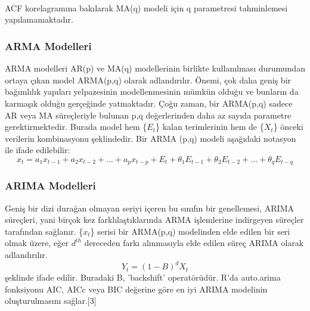 \documentclass[11pt]{article}
\begin{document}
    \begin{center}
    \end{center}
    { \hspace*{\fill} \\}
    
    \begin{center}
    \end{center}
    { \hspace*{\fill} \\}
    
    \begin{center}
    \end{center}
    { \hspace*{\fill} \\}
    
    ACF korelagramına bakılarak MA(q) modeli için q parametresi tahminlemesi
yapılamamaktadır. 

\subsubsection{ARMA Modelleri}\label{arima-modelleri} 

ARMA modelleri AR(p) ve MA(q) modellerinin
birlikte kullanılması durumundan ortaya çıkan model ARMA(p,q) olarak
adlandırılır. Önemi, çok daha geniş bir bağımlılık yapıları yelpazesinin
modellenmesinin mümkün olduğu ve bunların da karmaşık olduğu gerçeğinde
yatmaktadır. Çoğu zaman, bir ARMA(p,q) sadece AR veya MA süreçleriyle
bulunan p,q değerlerinden daha az sayıda parametre gerektirmektedir.
Burada model hem \{\(E_t\)\} kalan terimlerinin hem de \{\(X_t\)\}
önceki verilerin kombinasyonu şeklindedir. Bir ARMA (p,q) modeli
aşağıdaki notasyon ile ifade edilebilir:
\[x_t = a_1x_{t-1}+ a_2x_{t-2}+...+a_px_{t-p}+E_t + θ_1E_{t−1} + θ_2E_{t−2} + ... + θ_qE_{t-q}\]

\subsubsection{ARIMA Modelleri}\label{arima-modelleri}

Geniş bir dizi durağan olmayan seriyi içeren bu sınıfın bir genellemesi,
ARIMA süreçleri, yani birçok kez farklılaştıklarında ARMA işlemlerine
indirgeyen süreçler tarafından sağlanır. \{\(x_t\)\} serisi bir
ARMA(p,q) modelinden elde edilen bir seri olmak üzere, eğer \(d^{th}\)
dereceden farkı alınmasıyla elde edilen süreç ARIMA olarak adlandırılır.
\[Y_t=(1-B)^dX_t\] şeklinde ifade edilir. Buradaki B, 'backshift'
operatörüdür. R'da auto.arima fonksiyonu AIC, AICc veya BIC değerine
göre en iyi ARIMA modelinin oluşturulmasını sağlar.{[}3{]}
\end{document}

